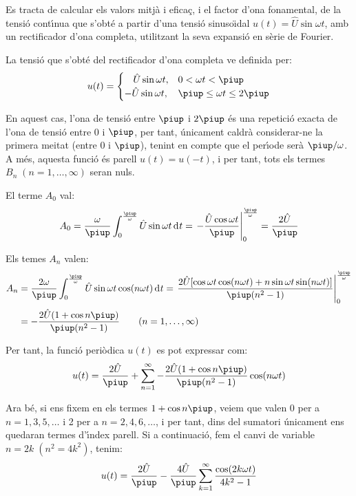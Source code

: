\begin{exemple}

Es tracta de calcular els valors mitj\`{a} i efica\c{c}, i el factor d'ona
fonamental, de la tensi\'{o} cont\'{\i}nua que s'obt\'{e} a partir d'una tensi\'{o}
sinuso\"{\i}dal $u(t) = \hat{U} \sin\omega t$, amb un rectificador d'ona
completa, utilitzant la seva expansi\'{o} en s\`{e}rie de Fourier.

La tensi\'{o} que s'obt\'{e} del rectificador d'ona completa ve definida
per:
\[
u(t) = \begin{cases} \rule{3.2mm}{0pt}\hat{U} \sin\omega t, & 0 < \omega t < \piup\\
       -\hat{U} \sin\omega t, & \piup \leq \omega t \leq 2\piup \end{cases}
\]

En aquest cas, l'ona de tensi\'{o} entre $\piup$ i $2\piup$ \'{e}s una repetici\'{o}
exacta de l'ona de tensi\'{o} entre 0 i $\piup$, per tant, \'{u}nicament
caldr\`{a} considerar-ne la primera meitat (entre 0 i $\piup$), tenint en
compte que el per\'{\i}ode ser\`{a} $\piup/\omega$. A m\'{e}s, aquesta funci\'{o} \'{e}s
parell $u(t) = u(-t)$, i per tant, tots els termes
$B_n\;(n=1,\ldots,\infty)$ seran nuls.

El terme $A_0$ val:
\[
A_0 = \frac{\omega}{\piup} \int_0^{\frac{\piup}{\omega}} \hat{U} \sin
\omega t \diff t = \left. -\frac{\hat{U} \cos \omega t}{\piup}
\right|_0^{\frac{\piup}{\omega}} = \frac{2\hat{U}}{\piup}
\]

Els temes $A_n$ valen:
\[
\begin{split}
A_n &= \frac{2 \omega}{\piup} \int_0^{\frac{\piup}{\omega}} \hat{U} \sin
\omega t \cos(n \omega t)\diff t = \left. \frac{2 \hat{U}[ \cos
\omega t \cos (n \omega t) + n \sin \omega t \sin(n \omega
t)]}{\piup(n^2-1)} \right|_0^{\frac{\piup}{\omega}}\\[0.5ex]
&= -\frac{2\hat{U}(1+\cos n \piup)}{\piup(n^2-1)}
\qquad(n=1,\ldots,\infty)
\end{split}
\]

Per tant, la funci\'{o} peri\`{o}dica $u(t)$ es pot expressar com:
\[
    u(t) = \frac{2\hat{U}}{\piup} + \sum_{n=1}^\infty
     -\frac{2\hat{U}(1+\cos n \piup)}{\piup(n^2-1)} \cos(n \omega t)
\]

Ara b\'{e}, si ens fixem en els termes $1+\cos n \piup$, veiem que valen 0
per a $n=1,3,5,\ldots$ i 2 per a $n=2,4,6,\ldots$, i per tant, dins
del sumatori \'{u}nicament ens quedaran termes d'\'{\i}ndex parell. Si a
continuaci\'{o}, fem el canvi de variable $n=2k\;(n^2=4k^2)$, tenim:
\[
u(t) = \frac{2\hat{U}}{\piup} - \frac{4\hat{U}}{\piup} \sum_{k=1}^\infty
      \frac{\cos(2 k \omega t)}{4k^2-1}
\]


\end{exemple}
